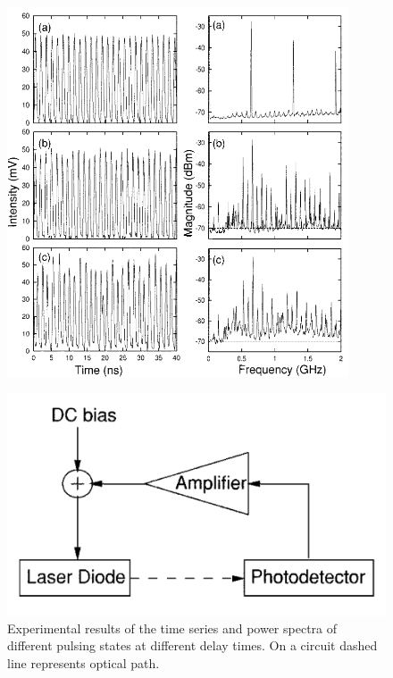 \begin{minipage}{0.55\textwidth}
    \begin{figure}[h]
    \centering
    \includegraphics[width=0.9\textwidth]{images/tang_exp.png}
\end{figure}
\end{minipage}
\hfill
\begin{minipage}{0.35\textwidth}
	\begin{figure}
		\includegraphics[width=1\textwidth]{images/tang_circr.png}
    \caption{Experimental results of the time series and power spectra of different pulsing states at different delay times.
    On a circuit dashed line represents optical path.}
	\end{figure}
\end{minipage}
